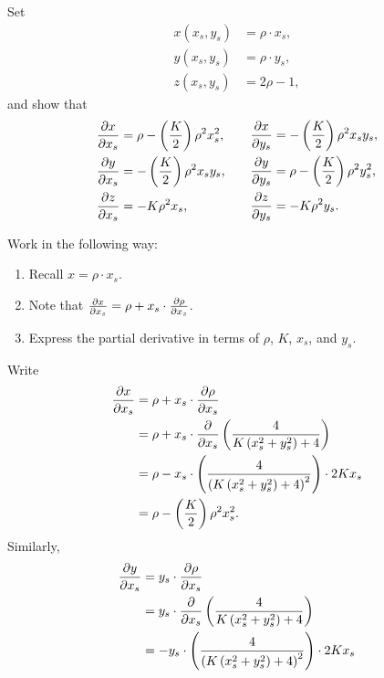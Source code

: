 \documentclass[newpage,hints,handout]{ximera}
\begin{document}
\begin{problem}
  Set
  \begin{align*}
    x(x_s,y_s) &=\rho\cdot x_s,\\
    y(x_s,y_s) &=\rho\cdot y_s,\\
    z(x_s,y_s) &=2\rho-1,
  \end{align*}
  and show that
  \[
  \begin{split}
    \pp[x]{x_s} &=\rho-\left(\frac{K}{2}\right)\rho^2x_s^2,\\
    \pp[y]{x_s} &=-\left(\frac{K}{2}\right)\rho^2x_sy_s,\\
    \pp[z]{x_s} &=-K\rho^2x_s,
  \end{split}
  \qquad
  \begin{split}
    \pp[x]{y_s} &= -\left(\frac{K}{2}\right)\rho^2x_sy_s,\\
    \pp[y]{y_s} &=\rho-\left(\frac{K}{2}\right)\rho^2y_s^2,\\
    \pp[z]{y_s} &= -K\rho^2y_s.
  \end{split}
  \]
  \begin{hint}
  Work in the following way:
  \begin{enumerate}
  \item Recall $x = \rho\cdot x_s$.
  \item Note that $\pp[x]{x_s} = \rho + x_s \cdot \pp[\rho]{x_s}$.
  \item Express the partial derivative in terms of $\rho$, $K$, $x_s$,
      and $y_s$.
  \end{enumerate}
  \end{hint}
  \begin{freeResponse}
    Write
    \begin{align*}
      \pp[x]{x_s} &= \rho + x_s\cdot \pp[\rho]{x_s}\\
      &= \rho + x_s\cdot \pp{x_s}\left(\frac{4}{K\left(x_s^2 + y_s^2\right) + 4}\right)\\
      &= \rho - x_s\cdot \left(\frac{4}{\left(K\left(x_s^2 + y_s^2\right) + 4\right)^{2}}\right)\cdot2Kx_s \\
      &=\rho-\left(\frac{K}{2}\right)\rho^2x_s^2.
    \end{align*}
    Similarly,
      \begin{align*}
      \pp[y]{x_s} &= y_s\cdot \pp[\rho]{x_s}\\
      &= y_s\cdot \pp{x_s}\left(\frac{4}{K\left(x_s^2 + y_s^2\right) + 4}\right)\\
      &= - y_s\cdot \left(\frac{4}{\left(K\left(x_s^2 + y_s^2\right) + 4\right)^{2}}\right)\cdot2Kx_s \\

\end{align*}
\end{freeResponse}
\end{problem}
\end{document}
